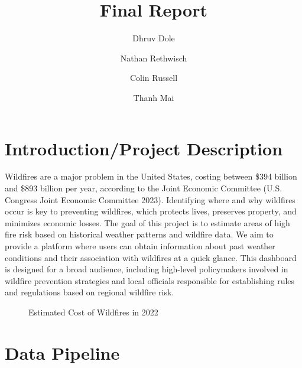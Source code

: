 \documentclass[
  12pt,
  letterpaper,
  DIV=11,
  numbers=noendperiod]{scrartcl}
\title{Final Report}
\author{Dhruv Dole \and Nathan Rethwisch \and Colin Russell \and Thanh
Mai}
\date{}
\begin{document}
\maketitle


\section{Introduction/Project
Description}\label{introductionproject-description}

Wildfires are a major problem in the United States, costing between
\$394 billion and \$893 billion per year, according to the Joint
Economic Committee (U.S. Congress Joint Economic Committee 2023).
Identifying where and why wildfires occur is key to preventing
wildfires, which protects lives, preserves property, and minimizes
economic losses. The goal of this project is to estimate areas of high
fire risk based on historical weather patterns and wildfire data. We aim
to provide a platform where users can obtain information about past
weather conditions and their association with wildfires at a quick
glance. This dashboard is designed for a broad audience, including
high-level policymakers involved in wildfire prevention strategies and
local officials responsible for establishing rules and regulations based
on regional wildfire risk.

\begin{figure}[H]


\caption{\label{fig-WildfireCost}Estimated Cost of Wildfires in 2022}

\end{figure}%

\section{Data Pipeline}\label{data-pipeline}
\end{document}
